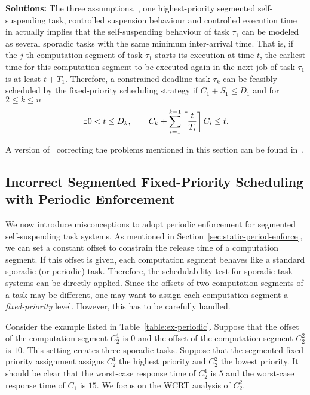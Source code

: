 {\bf Solutions:} The three assumptions, \ie, one highest-priority segmented self-suspending task, controlled suspension behaviour and controlled execution time  in \cite{RTSS-KimANR13} actually implies that the self-suspending behaviour of task $\tau_1$ can be modeled as several sporadic tasks with the same minimum inter-arrival time. That is, if the $j$-th computation segment of task $\tau_1$ starts its execution at time $t$, the earliest time for this computation segment to be executed again in the next job of task $\tau_1$ is at least $t+T_1$. Therefore, a constrained-deadline task $\tau_k$ can be feasibly scheduled by the fixed-priority scheduling strategy if $C_1+S_1 \leq D_1$ and for $2 \leq k \leq n$
  \begin{equation}
    \label{eq:tda-fixed}
\exists 0 < t \leq D_k, \qquad C_k + \sum_{i=1}^{k-1}\left\lceil{\frac{t}{T_i}}\right\rceil C_i \leq t.    
  \end{equation}

A version of~\cite{RTSS-KimANR13} correcting the problems mentioned in this section can be found in~\cite{Kim2016}.

\subsection{Incorrect Segmented Fixed-Priority Scheduling with Periodic Enforcement}
\label{sec:wrong-periodic}

We now introduce misconceptions to adopt periodic enforcement for segmented self-suspending task systems. As mentioned in Section~\ref{sec:static-period-enforce}, we can set a constant offset to constrain the release time of a computation segment. If this offset is given, each computation segment behaves like a standard sporadic (or periodic) task. Therefore, the schedulability test for sporadic task systems can be directly applied. Since the offsets of two computation segments of a task may be different, one may want to assign each computation segment a \emph{fixed-priority} level.  However, this has to be carefully handled. 



Consider the example listed in Table~\ref{table:ex-periodic}. Suppose that the offset of the computation segment $C_2^1$ is $0$ and the offset of the computation segment $C_2^2$ is $10$. This setting creates three sporadic tasks.
Suppose that the segmented fixed priority assignment assigns $C_2^1$ the highest priority and $C_2^2$ the lowest priority. It should be clear that the worst-case response time of $C_2^1$ is $5$ and the worst-case response time of $C_1$ is $15$. We focus on the WCRT analysis of $C_2^2$.


